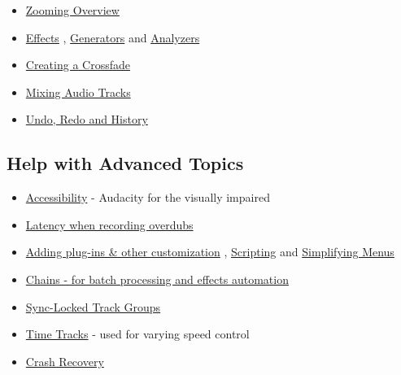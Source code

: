 \begin{multicols}{2}
\begin{itemize}
\item 
\hyperref[\foo{manXzoomingX}]{Zooming Overview}

\item 
\hyperref[\foo{manXindexXofXeffectsXgeneratorsXandXanalyzersX}]{Effects}
, 
\hyperref[\foo{manXindexXofXeffectsXgeneratorsXandXanalyzersXgenerators}]{Generators}
 and 
\hyperref[\foo{manXindexXofXeffectsXgeneratorsXandXanalyzersXanalyzers}]{Analyzers}

\item 
\hyperref[\foo{manXcreatingXaXcrossfadeX}]{Creating a Crossfade}

\item 
\hyperref[\foo{manXmixingX}]{Mixing Audio Tracks}

\item 
\hyperref[\foo{manXundoXredoXandXhistoryX}]{Undo, Redo and History}

\end{itemize}

\subsection{Help with Advanced Topics}
\begin{itemize}
\item 
\hyperref[\foo{manXaccessibilityX}]{Accessibility}
 - Audacity for the visually impaired 
\item 
\hyperref[\foo{manXlatencyXtestX}]{Latency when recording overdubs}

\item 
\hyperref[\foo{manXcustomizationX}]{Adding plug-ins \& other customization}
, 
\hyperref[\foo{manXscriptingX}]{Scripting}
 and 
\hyperref[\foo{manXsimplifyingXaudacityX}]{Simplifying Menus}

\item 
\hyperref[\foo{manXchainsXforXbatchXprocessingXandXeffectsXautomationX}]{Chains - for batch processing and effects automation}

\item 
\hyperref[\foo{manXsyncXlockedXtrackXgroupsX}]{Sync-Locked Track Groups}

\item 
\hyperref[\foo{manXtimeXtracksX}]{Time Tracks}
 - used for varying speed control
\item 
\hyperref[\foo{manXrecoveryX}]{Crash Recovery}

\end{itemize}

\label{indexXbottomXusing}
\label{indexXmisc}

\end{multicols}
